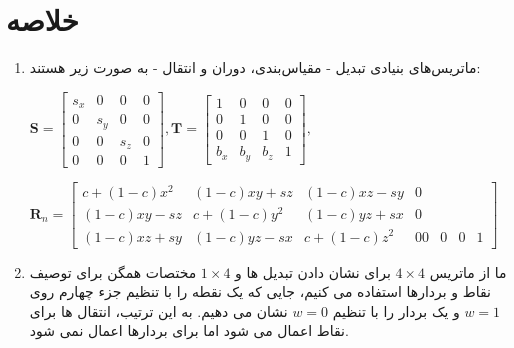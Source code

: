 \section{\textbf{خلاصه}}
\label{sec:3.7}
{
    \Large
    \begin{spacing}{1.5}
        \begin{enumerate}[label=\textbf{\arabic*}.]
            \item {ماتریس‌های بنیادی تبدیل - مقیاس‌بندی، دوران و انتقال - به صورت زیر هستند:
                \begin{center}
                    $\textbf{S}=\begin{bmatrix}
                                    s_x & 0   & 0   & 0 \\
                                    0   & s_y & 0   & 0 \\
                                    0   & 0   & s_z & 0 \\
                                    0   & 0   & 0   & 1
                    \end{bmatrix},\textbf{T}=\begin{bmatrix}
                                                 1     & 0     & 0     & 0 \\
                                                 0     & 1     & 0     & 0 \\
                                                 0     & 0     & 1     & 0 \\
                                                 b_{x} & b_{y} & b_{z} & 1
                    \end{bmatrix},$
                \end{center}

                $\textbf{R}_{n}=\begin{bmatrix}
                                    c+(1-c)x^{2} & (1-c)xy+sz & (1-c)xz-sy & 0\\
                                    (1-c)xy-sz & c+(1-c)y^{2} & (1-c)yz+sx & 0\\
                                    (1-c)xz+sy & (1-c)yz-sx & c+(1-c)z^{2} & 0
                                    0 & 0 & 0 & 1
                \end{bmatrix}$
            }

            \item {ما از ماتریس $4\times 4$ برای نشان دادن تبدیل ها و $1\times 4$ مختصات همگن برای توصیف نقاط و بردارها استفاده می کنیم،
            جایی که یک نقطه را با تنظیم جزء چهارم روی $w=1$ و یک بردار را با تنظیم $w=0$ نشان می دهیم.
            به این ترتیب، انتقال ها برای نقاط اعمال می شود اما برای بردارها اعمال نمی شود.}


\end{enumerate}
\end{spacing}}
